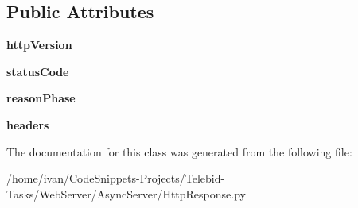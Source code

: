 \subsection*{Public Attributes}
\begin{DoxyCompactItemize}
\item 
\hypertarget{class_http_response_1_1_http_response_acbd04b682c461462dee12e974f087499}{{\bfseries http\-Version}}\label{class_http_response_1_1_http_response_acbd04b682c461462dee12e974f087499}

\item 
\hypertarget{class_http_response_1_1_http_response_af640be8844ce87ab7ed222ed8da6f6f1}{{\bfseries status\-Code}}\label{class_http_response_1_1_http_response_af640be8844ce87ab7ed222ed8da6f6f1}

\item 
\hypertarget{class_http_response_1_1_http_response_a772463ab8041c405927818926bdb4370}{{\bfseries reason\-Phase}}\label{class_http_response_1_1_http_response_a772463ab8041c405927818926bdb4370}

\item 
\hypertarget{class_http_response_1_1_http_response_a3d7a11cb3f47a0d21ab9b6814da0828c}{{\bfseries headers}}\label{class_http_response_1_1_http_response_a3d7a11cb3f47a0d21ab9b6814da0828c}

\end{DoxyCompactItemize}


The documentation for this class was generated from the following file\-:\begin{DoxyCompactItemize}
\item 
/home/ivan/\-Code\-Snippets-\/\-Projects/\-Telebid-\/\-Tasks/\-Web\-Server/\-Async\-Server/Http\-Response.\-py\end{DoxyCompactItemize}
